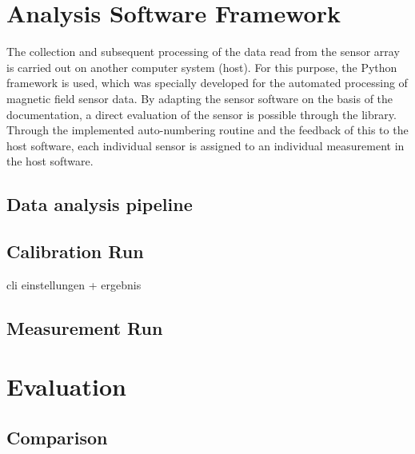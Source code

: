 \documentclass[conference]{IEEEtran}
\begin{document}
\section{Analysis Software Framework}

The collection and subsequent processing of the data read from the sensor array is carried out on another computer system (host).
For this purpose, the Python framework is used, which was specially developed for the automated processing of magnetic field sensor data.
By adapting the sensor software on the basis of the documentation, a direct evaluation of the sensor is possible through the library.
Through the implemented auto-numbering routine and the feedback of this to the host software, each individual sensor is assigned to an individual measurement in the host software.

\subsection{Data analysis pipeline}





\subsection{Calibration Run}

cli einstellungen
+ ergebnis

\subsection{Measurement Run}






\section{Evaluation}

\subsection{Comparison}
\end{document}
